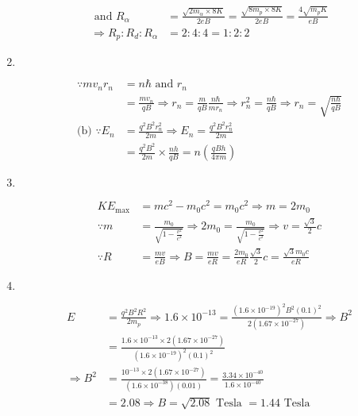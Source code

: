 \begin{enumerate}
\begin{answer}
\begin{align*}
	\text { and } R_{\alpha}&=\frac{\sqrt{2 m_{\alpha} \times 8 K}}{2 e B}=\frac{\sqrt{8 m_{p} \times 8 K}}{2 e B}=\frac{4 \sqrt{m_{p} K}}{e B} \\
	\Rightarrow R_{p}: R_{d}: R_{\alpha}&=2: 4: 4=1: 2: 2
	\end{align*}
\end{answer}
\item $\left. \right. $
\begin{answer}
	\begin{align*}
	\because m v_{n} r_{n}&=n \hbar\text{ and }r_{n}\\&=\frac{m v_{n}}{q B} \Rightarrow r_{n}=\frac{m}{q B} \frac{n \hbar}{m r_{n}} \Rightarrow r_{n}^{2}=\frac{n \hbar}{q B} \Rightarrow r_{n}=\sqrt{\frac{n \hbar}{q B}}\\
	\text{(b) }\because E_{n}&=\frac{q^{2} B^{2} r_{n}^{2}}{2 m} \Rightarrow E_{n}=\frac{q^{2} B^{2} r_{n}^{2}}{2 m}\\&=\frac{q^{2} B^{2}}{2 m} \times \frac{n h}{q B}=n\left(\frac{q B h}{4 \pi m}\right)
	\end{align*}
\end{answer}
\item $\left. \right. $
\begin{answer}
	\begin{align*}
	K E_{\max }&=m c^{2}-m_{0} c^{2}=m_{0} c^{2} \Rightarrow m=2 m_{0}\\
	\because m&=\frac{m_{0}}{\sqrt{1-\frac{v^{2}}{c^{2}}}} \Rightarrow 2 m_{0}=\frac{m_{0}}{\sqrt{1-\frac{v^{2}}{c^{2}}}} \Rightarrow v=\frac{\sqrt{3}}{2} c \\
	\because R&=\frac{m v}{e B} \Rightarrow B=\frac{m v}{e R}=\frac{2 m_{0}}{e R} \frac{\sqrt{3}}{2} c=\frac{\sqrt{3} m_{0} c}{e R}
	\end{align*}
\end{answer}
\item $\left. \right. $
\begin{answer}
	\begin{align*}
	E&=\frac{q^{2} B^{2} R^{2}}{2 m_{p}} \Rightarrow 1.6 \times 10^{-13}=\frac{\left(1.6 \times 10^{-19}\right)^{2} B^{2}(0.1)^{2}}{2\left(1.67 \times 10^{-27}\right)} \Rightarrow B^{2}\\&=\frac{1.6 \times 10^{-13} \times 2\left(1.67 \times 10^{-27}\right)}{\left(1.6 \times 10^{-19}\right)^{2}(0.1)^{2}}\\
	\Rightarrow B^{2}&=\frac{10^{-13} \times 2\left(1.67 \times 10^{-27}\right)}{\left(1.6 \times 10^{-38}\right)(0.01)}=\frac{3.34 \times 10^{-40}}{1.6 \times 10^{-40}}\\&=2.08 \Rightarrow B=\sqrt{2.08}\text{ Tesla $=1.44$ Tesla}

\end{align*}
\end{answer}
\end{enumerate}
